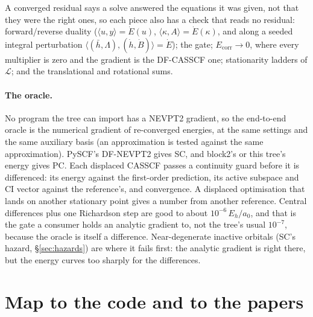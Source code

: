\documentclass[11pt]{article}
\newcommand{\Ecorr}{E_{\mathrm{corr}}}
\newcommand{\hb}{\bar h}
\newcommand{\Lb}{\Lambda}
\begin{document}
A converged residual says a solve answered the equations it was given, not
that they were the right ones, so each piece also has a check that reads no
residual: forward/reverse duality ($\langle u, y\rangle = \dot E(u)$,
$\langle\kappa, A\rangle = \dot E(\kappa)$, and along a seeded integral
perturbation $\langle(\hb, \Lb), (\dot h, \dot B)\rangle = \dot E$); the gate;
$\Ecorr\to0$, where every multiplier is zero and the gradient is the
DF-CASSCF one; stationarity ladders of $\mathcal L$; and the translational
and rotational sums.

\paragraph{The oracle.}
\label{sec:oracle}
No program the tree can import has a NEVPT2 gradient, so the end-to-end
oracle is the numerical gradient of re-converged energies, at the same
settings and the same auxiliary basis (an approximation is tested against
the same approximation). PySCF's DF-NEVPT2 gives SC, and block2's or this
tree's energy gives PC. Each displaced CASSCF passes a continuity guard
before it is differenced: its energy against the first-order prediction,
its active subspace and CI vector against the reference's, and convergence.
A displaced optimisation that lands on another stationary point gives a
number from another reference. Central differences plus one Richardson step
are good to about $10^{-6}\,E_h/a_0$, and that is the gate a consumer holds
an analytic gradient to, not the tree's usual $10^{-7}$, because the oracle
is itself a difference. Near-degenerate inactive orbitals (SC's hazard,
\S\ref{sec:hazards}) are where it fails first: the analytic gradient is
right there, but the energy curves too sharply for the differences.

\section{Map to the code and to the papers}
\label{sec:map}
\end{document}
